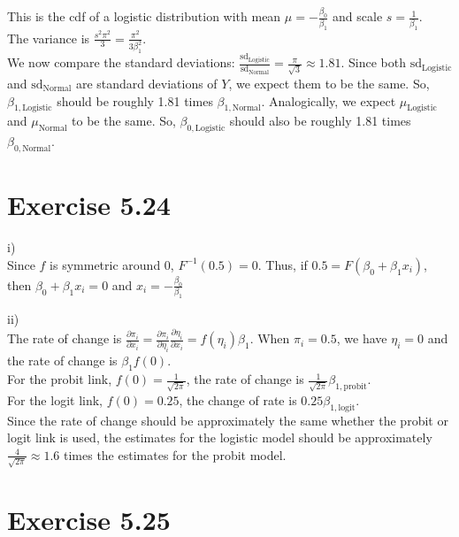 \documentclass[a4paper]{article}
\begin{document}
This is the cdf of a logistic distribution with mean $\mu = -\frac{\beta_{0}}{\beta_{1}}$ and scale $s = \frac{1}{\beta_{1}}$.\\
The variance is $\frac{s^{2}\pi^{2}}{3} = \frac{\pi^{2}}{3\beta_{1}^{2}}$.\\

We now compare the standard deviations: $\frac{\mathrm{sd}_{\mathrm{Logistic}}}{\mathrm{sd}_{\mathrm{Normal}}} = \frac{\pi}{\sqrt{3}} \approx 1.81$. Since both $\mathrm{sd}_{\mathrm{Logistic}}$ and $\mathrm{sd}_{\mathrm{Normal}}$ are standard deviations of $Y$, we expect them to be the same. So, $\beta_{1, \mathrm{Logistic}}$ should be roughly 1.81 times $\beta_{1, \mathrm{Normal}}$. Analogically, we expect $\mu_{\mathrm{Logistic}}$ and $\mu_{\mathrm{Normal}}$ to be the same. So, $\beta_{0, \mathrm{Logistic}}$ should also be roughly 1.81 times $\beta_{0, \mathrm{Normal}}$.


\vspace{\baselineskip}
\section{Exercise 5.24}
i)\\
Since $f$ is symmetric around $0$, $F^{-1}(0.5) = 0$. Thus, if $0.5 = F(\beta_{0} + \beta_{1}x_{i})$, then $\beta_{0} + \beta_{1}x_{i} = 0$ and $x_{i} = -\frac{\beta_{0}}{\beta_{1}}$

ii)\\
The rate of change is $\frac{\partial \pi_{i}}{\partial x_{i}} = \frac{\partial \pi_{i}}{\partial \eta_{i}}\frac{\partial \eta_{i}}{\partial x_{i}} = f(\eta_{i})\beta_{1}$. When $\pi_{i} = 0.5$, we have $\eta_{i} = 0$ and the rate of change is $\beta_{1}f(0)$.\\

For the probit link, $f(0) = \frac{1}{\sqrt{2\pi}}$, the rate of change is $\frac{1}{\sqrt{2\pi}}\beta_{1,\mathrm{probit}}$.\\
For the logit link, $f(0) = 0.25$, the change of rate is $0.25\beta_{1,\mathrm{logit}}$.\\

Since the rate of change should be approximately the same whether the probit or logit link is used, the estimates for the logistic model should be approximately $\frac{4}{\sqrt{2\pi}} \approx 1.6$ times the estimates for the probit model.


\vspace{\baselineskip}
\section{Exercise 5.25}
\end{document}
